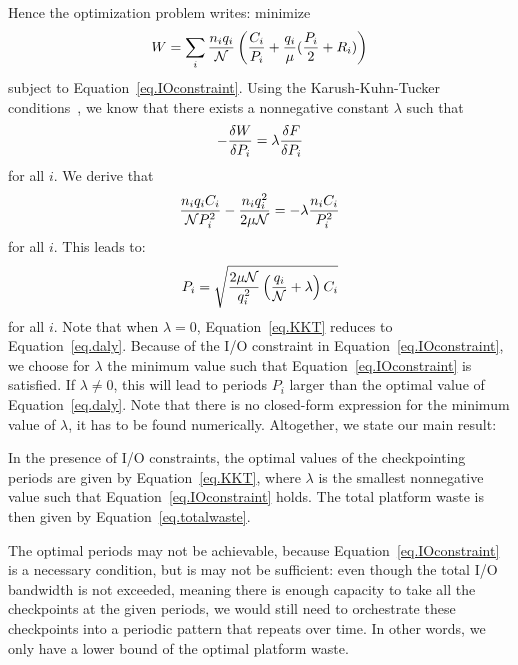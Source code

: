 Hence the optimization problem writes: minimize
\begin{equation}
W = \sum_i \frac{n_{i} q_{i}}{{\mathcal N}}  \left( \frac{C_{i}}{P_{i}} +
\frac{q_{i}}{\mu}(\frac{P_{i}}{2} + R_{i}) \right)
\label{eq.totalwaste}
\end{equation}
subject to Equation~\eqref{eq.IOconstraint}.
Using the Karush-Kuhn-Tucker conditions~\cite{Boyd2004}, we know that there exists a nonnegative constant
$\lambda$
such that
$$- \frac{\delta W}{\delta P_{i}} = \lambda \frac{\delta F}{\delta P_{i}}$$
for all $i$. We derive that
$$\frac{n_{i} q_{i} C_{i}}{{\mathcal N} P_{i}^{2}} -    \frac{n_{i} q_{i}^{2}}{2 \mu {\mathcal N}} = - \lambda \frac{n_{i} C_{i}}{P_{i}^{2}}
$$
for all $i$. This leads to:
 \begin{equation}
P_{i} = \sqrt{\frac{2 \mu  {\mathcal N}}{q_{i}^{2}} \left(\frac{q_{i}}{{\mathcal N}} +\lambda \right) C_{i}}
  \label{eq.KKT}
\end{equation}
for all $i$. Note that when $\lambda=0$, Equation~\eqref{eq.KKT} reduces to Equation~\eqref{eq.daly}. Because of the I/O constraint in Equation~\eqref{eq.IOconstraint},
we choose for $\lambda$ the minimum value such that Equation~\eqref{eq.IOconstraint}
  is satisfied. If $\lambda \neq 0$, this will lead to periods $P_{i}$ larger than the optimal value of Equation~\eqref{eq.daly}. Note that there is no closed-form expression for the minimum value of $\lambda$,
  it has to be found numerically.
   Altogether, we state our main result:

   \begin{theorem}
  In the presence of I/O constraints, the optimal values of the checkpointing periods are given
  by Equation~\eqref{eq.KKT}, where $\lambda$ is the smallest nonnegative value such that
  Equation~\eqref{eq.IOconstraint} holds. The total platform waste is then given by
  Equation~\eqref{eq.totalwaste}.
\end{theorem}

The optimal periods may not be achievable, because Equation~\eqref{eq.IOconstraint} is a necessary condition, but is may not be sufficient:
even though the total I/O bandwidth is not exceeded, meaning there is enough capacity to take all the checkpoints at the given periods, we would still need to orchestrate these checkpoints into a periodic pattern that repeats over time. In other words, we only have a lower bound of the optimal platform waste.
